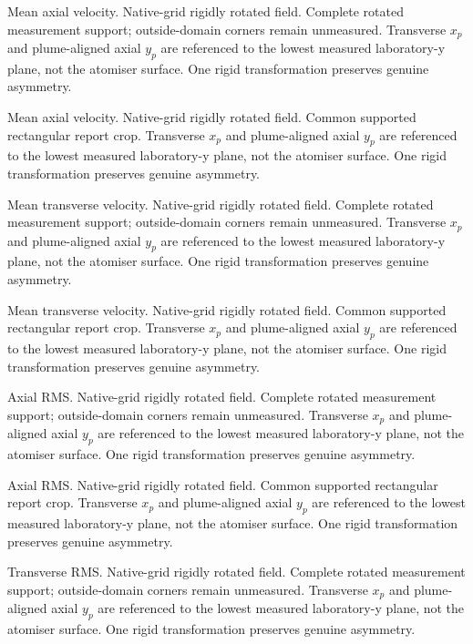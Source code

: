 \caption{Mean axial velocity. Native-grid rigidly rotated field. Complete rotated measurement support; outside-domain corners remain unmeasured. Transverse $x_p$ and plume-aligned axial $y_p$ are referenced to the lowest measured laboratory-y plane, not the atomiser surface. One rigid transformation preserves genuine asymmetry.}

\caption{Mean axial velocity. Native-grid rigidly rotated field. Common supported rectangular report crop. Transverse $x_p$ and plume-aligned axial $y_p$ are referenced to the lowest measured laboratory-y plane, not the atomiser surface. One rigid transformation preserves genuine asymmetry.}

\caption{Mean transverse velocity. Native-grid rigidly rotated field. Complete rotated measurement support; outside-domain corners remain unmeasured. Transverse $x_p$ and plume-aligned axial $y_p$ are referenced to the lowest measured laboratory-y plane, not the atomiser surface. One rigid transformation preserves genuine asymmetry.}

\caption{Mean transverse velocity. Native-grid rigidly rotated field. Common supported rectangular report crop. Transverse $x_p$ and plume-aligned axial $y_p$ are referenced to the lowest measured laboratory-y plane, not the atomiser surface. One rigid transformation preserves genuine asymmetry.}

\caption{Axial RMS. Native-grid rigidly rotated field. Complete rotated measurement support; outside-domain corners remain unmeasured. Transverse $x_p$ and plume-aligned axial $y_p$ are referenced to the lowest measured laboratory-y plane, not the atomiser surface. One rigid transformation preserves genuine asymmetry.}

\caption{Axial RMS. Native-grid rigidly rotated field. Common supported rectangular report crop. Transverse $x_p$ and plume-aligned axial $y_p$ are referenced to the lowest measured laboratory-y plane, not the atomiser surface. One rigid transformation preserves genuine asymmetry.}

\caption{Transverse RMS. Native-grid rigidly rotated field. Complete rotated measurement support; outside-domain corners remain unmeasured. Transverse $x_p$ and plume-aligned axial $y_p$ are referenced to the lowest measured laboratory-y plane, not the atomiser surface. One rigid transformation preserves genuine asymmetry.}

